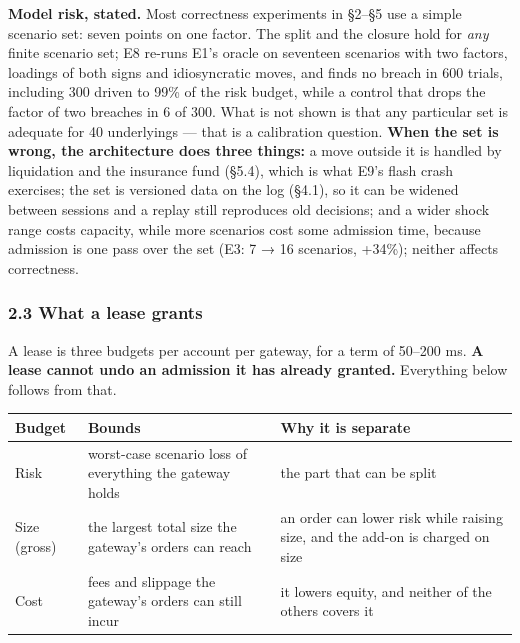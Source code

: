 \documentclass[10pt,a4paper]{article}
\newcounter{none}  %
\begin{document}
\textbf{Model risk, stated.} Most correctness experiments in §2--§5 use a simple
scenario set: seven points on one factor. The split and the closure hold for
\emph{any} finite scenario set; E8 re-runs E1's oracle on seventeen scenarios with two
factors, loadings of both signs and idiosyncratic moves, and finds no breach in
600 trials, including 300 driven to 99\% of the risk budget, while a control that
drops the factor of two breaches in 6 of 300. What is not shown is that any
particular set is adequate for 40 underlyings --- that is a calibration question.
\textbf{When the set is wrong, the architecture does three things:} a move outside it
is handled by liquidation and the insurance fund (§5.4), which is what E9's
flash crash exercises; the set is versioned data on the log (§4.1), so it can be
widened between sessions and a replay still reproduces old decisions; and a
wider shock range costs capacity, while more scenarios cost some admission time,
because admission is one pass over the set (E3: 7 → 16 scenarios, +34\%);
neither affects correctness.

\subsubsection{2.3 What a lease grants}\label{what-a-lease-grants}

A lease is three budgets per account per gateway, for a term of 50--200 ms. \textbf{A
lease cannot undo an admission it has already granted.} Everything below
follows from that.

{\def\LTcaptype{none} %
\begin{longtable}[]{@{}
  >{\raggedright\arraybackslash}p{}
  >{\raggedright\arraybackslash}p{}
  >{\raggedright\arraybackslash}p{}@{}}
\toprule\noalign{}
\begin{minipage}[b]{\linewidth}\raggedright
Budget
\end{minipage} & \begin{minipage}[b]{\linewidth}\raggedright
Bounds
\end{minipage} & \begin{minipage}[b]{\linewidth}\raggedright
Why it is separate
\end{minipage} \\
\midrule\noalign{}
\endhead
\bottomrule\noalign{}
\endlastfoot
Risk & worst-case scenario loss of everything the gateway holds & the part that can be split \\
Size (gross) & the largest total size the gateway's orders can reach & an order can lower risk while raising size, and the add-on is charged on size \\
Cost & fees and slippage the gateway's orders can still incur & it lowers equity, and neither of the others covers it \\
\end{longtable}
}
\end{document}
